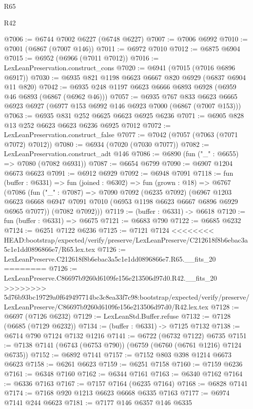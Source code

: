 \begin{lexlean}{R65}
\begin{lexlean}{R42}
\begin{coremodule}
{{{{{{{{{{{{{{{{{{{{{{{{{{{{{{{{{{{{{{{{{{{{{{{{{{{{{{{{{{{{{{{{{{{{{{{{{{{{{{{{{{{{{{{{{{{{{{{{{{{{{{{{{{{{{{{{{{{{{{{{{{{{{{{{{{{{{{{{{{{{{{{{{{{{{{{{{{{{{{{{{{{{{{{{{{{{{{{{{{{{{{{{@7006 := @6744 @7002 @6227 (@6748 @6227)
@7007 := @7006 @6992
@7010 := @7001 (@6867 (@7007 @146))
@7011 := @6972 @7010
@7012 := @6875 @6904
@7015 := @6952 (@6966 (@7011 @7012))
@7016 := LexLeanPreservation.construct_cons
@7020 := @6941 (@7015 (@7016 @6896 @6917))
@7030 := @6935 @821 @1198 @6623 @6667 @820 @6929 (@6837 @6904 @11 @820)
@7042 := @6935 @248 @1197 @6623 @6666 @6893 @6928 (@6959 @46 @6893 (@6867 (@6962 @46)))
@7057 := @6935
    @767
    @833
    @6623
    @6665
    @6923
    @6927
    (@6977 @153 @6992 @146 @6923 @7000 (@6867 (@7007 @153)))
@7063 := @6935 @831 @252 @6625 @6623 @6925 @6236
@7071 := @6905 @828 @13 @252 @6623 @6623 @6236 @6925 @7012
@7072 := LexLeanPreservation.construct_false
@7077 := @7042 (@7057 (@7063 (@7071 @7072) @7012))
@7080 := @6934 (@7020 (@7030 @7077))
@7082 := LexLeanPreservation.construct_adt @146
@7086 := @6890 (fun ("_" : @6655) => @7080 (@7082 @6931))
@7087 := @6654 @6799
@7090 := @6907 @1204 @6673 @6623
@7091 := @6912 @6929
@7092 := @6948 @7091
@7118 := fun (buffer : @6331) =>
  fun (joined : @6302) =>
  fun (grown : @18) =>
  @6767
    (@7086
      (fun ("_" : @7087) =>
      @7090
        @7092
        (@6235 @7092)
        (@6967
          @1203
          @6623
          @6668
          @6947
          @7091
          @7010
          (@6953 @1198 @6623 @6667 @6896 @6929 @6965 @7077))
        (@7082 @7092)))
@7119 := (buffer : @6331) -> @6618
@7120 := fun (buffer : @6331) => @6675
@7121 := @6683 @790
@7122 := @6685 @6232
@7124 := @6251 @7122 @6236
@7125 := @7121 @7124
<<<<<<<< HEAD:bootstrap/expected/verify/preserve/LexLeanPreserve/C212618f8b6ebac3a5c1e1dd0896866e7/R65.lex.tex
@7126 := LexLeanPreserve.C212618f8b6ebac3a5c1e1dd0896866e7.R65.__fits_20
========
@7126 := LexLeanPreserve.C86697b9260d6109fe156e213506d97d0.R42.__fits_20
>>>>>>>> 5d76b93bc19729a0f649497714bc3c8ea33f7c98:bootstrap/expected/verify/preserve/LexLeanPreserve/C86697b9260d6109fe156e213506d97d0/R42.lex.tex
@7128 := @6697 (@7126 @6232)
@7129 := LexLeanStd.Buffer.refuse
@7132 := @7128 (@6685 (@7129 @6232))
@7134 := (buffer : @6331) -> @7125 @7132
@7138 := @6714 @790 @7124 @7132 @1216
@7141 := @6722 (@6732 @7122) @6735
@7151 := @7138 @7141 (@6743 (@6753 @790)) (@6759 (@6760 (@6761 @1216) @7124 @6735))
@7152 := @6892 @7141
@7157 := @7152 @803 @398 @1214 @6673 @6623
@7158 := @6261 @6623
@7159 := @6251 @7158
@7160 := @7159 @6236
@7161 := @6348 @7160
@7162 := @6344 @7161
@7163 := @6340 @7162
@7164 := @6336 @7163
@7167 := @7157 @7164 (@6235 @7164)
@7168 := @6828 @7141
@7174 := @7168 @920 @1213 @6623 @6668 @6335 @7163
@7177 := @6974 @7141 @244 @6623
@7181 := @7177 @146 @6357 @146 @6335
}}}}}}}}}}}}}}}}}}}}}}}}}}}}}}}}}}}}}}}}}}}}}}}}}}}}}}}}}}}}}}}}}}}}}}}}}}}}}}}}}}}}}}}}}}}}}}}}}}}}}}}}}}}}}}}}}}}}}}}}}}}}}}}}}}}}}}}}}}}}}}}}}}}}}}}}}}}}}}}}}}}}}}}}}}}}}}}}}}}}}}}}
\end{coremodule}
\end{lexlean}
\end{lexlean}
